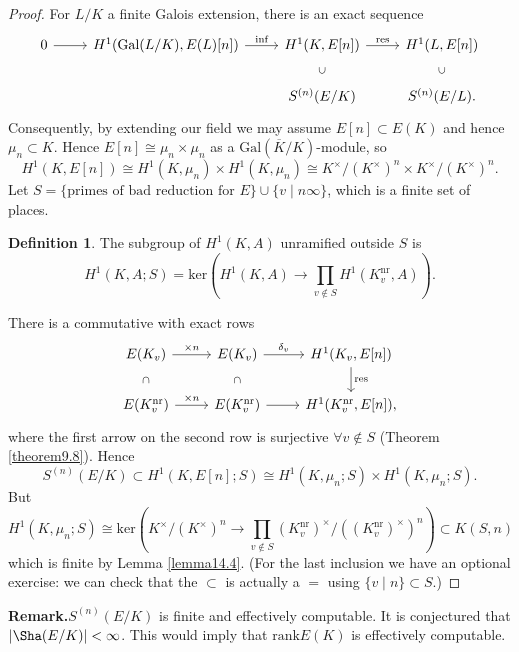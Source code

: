 \documentclass{article}
\theoremstyle{definition}
\newtheorem{defn}{Definition}[section]
\begin{document}
\begin{proof}
    For $L/K$ a finite Galois extension, there is an exact sequence
    \[
    \begin{tikzcd}
        0 \arrow{r} & H^1(\text{Gal}(L/K), E(L)[n]) \arrow{r}{\text{inf}} & H^1(K,E[n]) \arrow{r}{\text{res}} & H^1(L,E[n]) \\
        & & S^{(n)}(E/K) \arrow[draw=none]{u}[sloped,auto=false, rotate=0]{\subset}& S^{(n)}(E/L) \arrow[draw=none]{u}[sloped,auto=false, rotate=0]{\subset}.
    \end{tikzcd}
    \]
    Consequently, by extending our field we may assume $E[n] \subset E(K)$ and hence $\mu_n \subset K$. Hence $E[n] \cong \mu_n \times \mu_n$ as a $\text{Gal}(\overline{K}/K)$-module, so $$H^1(K,E[n]) \cong H^1(K,\mu_n) \times H^1(K,\mu_n) \cong K^\times /(K^\times)^n \times K^\times/(K^\times)^n.$$
    Let $S = \{\text{primes of bad reduction for }E\} \cup \{v \mid n \infty\}$, which is a finite set of places.
    \begin{defn}\label{defn15.6}
        The subgroup of $H^1(K,A)$ unramified outside $S$ is \[
        H^1(K,A;S) = \text{ker}\left(H^1(K,A) \to \prod_{v \not\in S}^{} H^1(K_v^{\text{nr}},A) \right).
        \]
    \end{defn}
    There is a commutative with exact rows
    \[
    \begin{tikzcd}
        E(K_v) \arrow{r}{\times n}\arrow[draw=none]{d}[sloped,auto=false, rotate=0]{\subset} & E(K_v) \arrow{r}{\delta_v}\arrow[draw=none]{d}[sloped,auto=false, rotate=0]{\subset} & H^1(K_v,E[n])\arrow{d}{\text{res}}\\
        E(K_v^{\text{nr}}) \arrow{r}{\times n} & E(K_v^{\text{nr}}) \arrow{r} & H^1(K_v^{\text{nr}}, E[n]),
    \end{tikzcd}
    \]
    where the first arrow on the second row is surjective $\forall v \not\in S$ (Theorem \ref{theorem9.8}). Hence $$S^{(n)}(E/K) \subset H^1(K,E[n];S) \cong H^1(K,\mu_n;S) \times H^1(K,\mu_n;S).$$
    But $$H^1(K,\mu_n;S) \cong \text{ker}\left(K^\times/(K^\times)^n \to \prod_{v \not\in S}^{} (K_v^{\text{nr}})^\times/((K_v^{\text{nr}})^\times)^n\right) \subset K(S,n)$$
    which is finite by Lemma \ref{lemma14.4}. (For the last inclusion we have an optional exercise: we can check that the $\subset$ is actually a $=$ using $\{v \mid n\}\subset S$.)
\end{proof}
\textbf{Remark.}$S^{(n)}(E/K)$ is finite and effectively computable. It is conjectured that $\left|\Sha(E/K)\right|<\infty$. This would imply that $\text{rank}E(K)$ is effectively computable.
\end{document}
